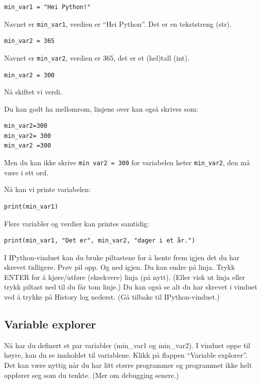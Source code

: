 \begin{lstlisting}
min_var1 = "Hei Python!"
\end{lstlisting}

Navnet er \lstinline{min_var1}, verdien er ``Hei Python''. Det er en tekststreng (str). 

\begin{lstlisting}
min_var2 = 365
\end{lstlisting}

Navnet er \lstinline{min_var2}, verdien er 365, det er et (hel)tall (int). 

\begin{lstlisting}
min_var2 = 300
\end{lstlisting}

Nå skiftet vi verdi. 

Du kan godt ha mellomrom, linjene over kan også skrives som: 
\begin{lstlisting}
min_var2=300
min_var2= 300
min_var2 =300
\end{lstlisting}

Men du kan ikke skrive \lstinline{min var2 = 300} for variabelen heter \lstinline{min_var2}, den må være i ett ord. 

Nå kan vi printe variabelen:
\begin{lstlisting}
print(min_var1)
\end{lstlisting}
Flere variabler og verdier kan printes samtidig:
\begin{lstlisting}
print(min_var1, "Det er", min_var2, "dager i et år.")
\end{lstlisting}

I IPython-vinduet kan du bruke piltastene for å hente frem igjen det du har skrevet tidligere. Prøv pil opp. Og ned igjen. Du kan endre på linja. Trykk ENTER for å kjøre/utføre (eksekvere) linja (på nytt). (Eller visk ut linja eller trykk piltast ned til du får tom linje.) Du kan også se alt du har skrevet i vinduet ved å trykke på History log nederst. (Gå tilbake til IPython-vinduet.) 

\subsection{Variable explorer}

Nå har du definert et par variabler (min\_{}var1 og min\_{}var2). I vinduet oppe til høyre, kan du se innholdet til variablene. Klikk på flappen ``Variable explorer''. Det kan være nyttig når du har litt større programmer og programmet ikke helt oppfører seg som du tenkte. (Mer om debugging senere.) 

